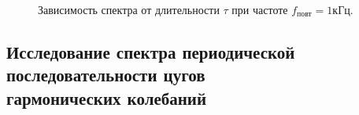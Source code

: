 \documentclass[a4paper, 12pt,twoside]{article}
\begin{document}
\begin{figure}[h]
	\centering
	\begin{minipage}[h]{0.49\linewidth}
	\end{minipage}
	\begin{minipage}[h]{0.49\linewidth}
	\end{minipage}
	
	\caption{Зависимость спектра от длительности $\tau$ при частоте $f_{\text{повт}} = 1\text{кГц}$.}
	\label{ris:image1}
\end{figure}

\subsection*{Исследование спектра периодической последовательности цугов \\ гармонических колебаний}
\end{document}
